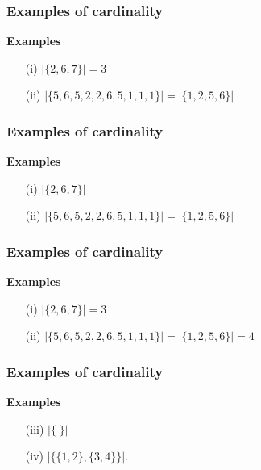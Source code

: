 \documentclass[]{report}
\begin{document}
\begin{frame}
	\frametitle{Examples of cardinality}
	\LARGE
	\vspace{-1cm}
	\textbf{Examples}
	\begin{itemize}
		\item[(i)] $|\{2,6,7\}| = 3 $
		\vspace{2cm}
		\item[(ii)] $|\{5,6,5,2,2,6,5,1,1,1\}| = |\{1,2,5,6\}| $
	\end{itemize}
\end{frame}

\begin{frame}
	\frametitle{Examples of cardinality}
	\LARGE
	\vspace{-1cm}
	\textbf{Examples}
	\begin{itemize}
		\item[(i)] $|\{2,6,7\}| $
		\vspace{2cm}
		\item[(ii)] $|\{5,6,5,2,2,6,5,1,1,1\}| = |\{1,2,5,6\}| $
	\end{itemize}
\end{frame}

\begin{frame}
	\frametitle{Examples of cardinality}
	\LARGE
	\vspace{-1cm}
	\textbf{Examples}
	\begin{itemize}
		\item[(i)] $|\{2,6,7\}| = 3$
		\vspace{2cm}
		\item[(ii)] $|\{5,6,5,2,2,6,5,1,1,1\}| = |\{1,2,5,6\}| = 4$
	\end{itemize}
\end{frame}
\begin{frame}
	\frametitle{Examples of cardinality}
	\LARGE
	\vspace{-1cm}
	\textbf{Examples}
	\begin{itemize}
		\item[(iii)] $|\{ \; \}| $
		\vspace{2cm}
		\item[(iv)] $|\{\{1,2\},\{3,4\}\}| $.
	\end{itemize}
\end{frame}
\end{document}
